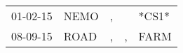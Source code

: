 \begin{supertabular}{lllll}
 01-02-15 &  NEMO &  , &    &  *CS1* \\
 08-09-15 &  ROAD &  , &  , &   FARM \\
\end{supertabular}
